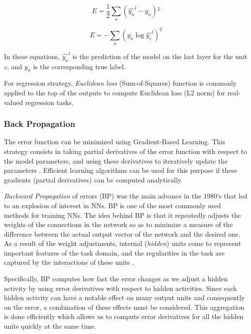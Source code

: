 \begin{equation}
E = \frac{1}{2} \sum\limits_{n} ( \hat{y_n}^{l} - y_n ){^2}
\label{eq:SE}
\end{equation}

\begin{equation}
E = -\sum\limits_{n}(y_n \log \hat{y_c}^{l})^{2}
\label{eq:CE}
\end{equation}

In these equations, $\hat{y_n}^{l}$ is the prediction of the model on the last layer for the unit \textit{c}, and $y_n$  is the corresponding true label.

For regression strategy, \textit{Euclidean loss} (Sum-of-Squares) function is commonly applied to the top of the outputs to compute Euclidean loss (L2 norm) for real-valued regression tasks.
 


\subsubsection{Back Propagation}
\label{subsec:bp}

The error function can be minimized using Gradient-Based Learning. This strategy consists in taking partial derivatives of the error function with respect to the model parameters, and using these derivatives to iteratively update the parameters \cite{lecun1998gradient}. Efficient learning algorithms can be used for this purpose if these gradients (partial derivatives) can be computed analytically.

\textit{Backward Propagation} of errors (BP) was the main advance in the 1980's that led to an explosion of interest in NNs. BP is one of the most commonly used methods for training NNs. The idea behind BP is that it repeatedly adjusts the weights of the connections in the network so as to minimize a measure of the difference between the actual output vector of the network and the desired one. As a result of the weight adjustments, internal (\textit{hidden}) units come to represent important features of the task domain, and the regularities in the task are captured by the interactions of these units \cite{williams1986learning}.

Specifically, BP computes how fast the error changes as we adjust a hidden activity by using error derivatives with respect to hidden activities. Since each hidden activity can have a notable effect on many output units and consequently on the error, a combination of these effects must be considered. This aggregation is done efficiently which allows us to compute error derivatives for all the hidden units quickly at the same time. 

